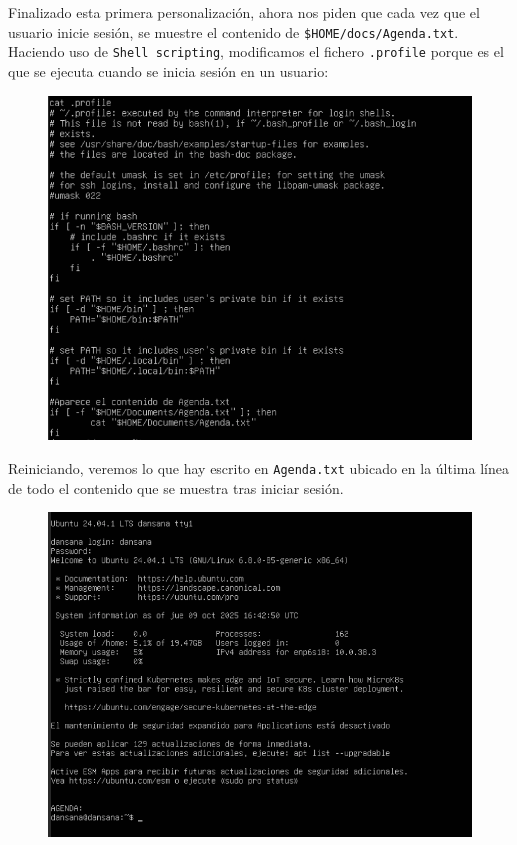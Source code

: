 \documentclass[10pt]{article}
\begin{document}
	Finalizado esta primera personalización, ahora nos piden que cada vez que el usuario inicie sesión, se muestre el contenido de \verb|$HOME/docs/Agenda.txt|. Haciendo uso de \verb|Shell scripting|, modificamos el fichero \verb|.profile| porque es el que se ejecuta cuando se inicia sesión en un usuario:
	\begin{figure}[H]
		\setlength{\abovecaptionskip}{0cm}
		\setlength{\belowcaptionskip}{0cm}
		\centering
		\includegraphics[width=0.7\linewidth]{Recursos/profile.png}
	\end{figure}
	Reiniciando, veremos lo que hay escrito en \verb|Agenda.txt| ubicado en la última línea de todo el contenido que se muestra tras iniciar sesión.
	\begin{figure}[H]
		\setlength{\abovecaptionskip}{0cm}
		\setlength{\belowcaptionskip}{0cm}
		\centering
		\includegraphics[width=0.7\linewidth]{Recursos/inicioProfile.png}
	\end{figure}
	\clearpage
	
\end{document}
